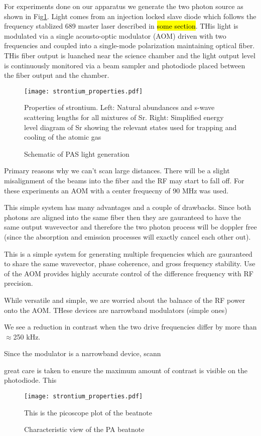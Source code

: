 For experiments done on our apparatus we generate the two photon source as shown in Fig\ref{fig:pas_light_gen}. Light comes from an injection locked slave diode which follows the frequency stablized 689 master laser described in \hl{some section}. THis light is modulated via a single acousto-optic modulator (AOM) driven with two frequencies and coupled into a single-mode polarization maintaining optical fiber. THis fiber output is luanched near the science chamber and the light output level is continuously monitored via a beam sampler and photodiode placed between the fiber output and the chamber.

\begin{figure}
\label{fig:pas_light_gen}
	\centerline{
	\texttt{[image: strontium\_properties.pdf]}}
	\caption{Schematic of PAS light generation}{Properties of strontium. Left: Natural abundances and s-wave scattering lengths for all mixtures of Sr. Right: Simplified energy level diagram of Sr showing the relevant states used for trapping and cooling of the atomic gas}
\end{figure} 

Primary reasons why we can't scan large distances. There will be a slight misalignment of the beams into the fiber and the RF may start to fall off. For these experiments an AOM with a center frequecny of 90 MHz was used. 

This simple system has many advantages and a couple of drawbacks. Since both photons are aligned into the same fiber then they are gauranteed to have the same output wavevector and therefore the two photon process will be doppler free (since the absorption and emission processes will exactly cancel each other out).

This is a simple system for generating multiple frequencies which are gauranteed to share the same wavevector, phase coherence, and gross frequency stability. Use of the AOM provides highly accurate control of the difference frequency with RF precision. 

While versatile and simple, we are worried about the balnace of the RF power onto the AOM. THese devices are narrowband modulators (simple ones) 

We see a reduction in contrast when the two drive frequencies differ by more than $\approx$250 kHz. 

Since the modulator is a narrowband device, scann

great care is taken to ensure the maximum amount of contrast is visible on the photodiode. This 

\begin{figure}
\label{fig:pas_light_balance}
	\centerline{
	\texttt{[image: strontium\_properties.pdf]}}
	\caption{Characteristic view of the PA beatnote}{This is the picoscope plot of the beatnote}
\end{figure} 

